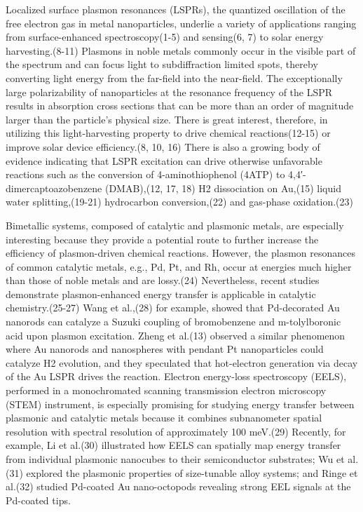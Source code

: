 \documentclass [11pt, proquest] {uwthesis}[2016/11/22]
\begin{document}
Localized surface plasmon resonances (LSPRs), the quantized oscillation of the free electron gas in metal nanoparticles, underlie a variety of applications ranging from surface-enhanced spectroscopy(1-5) and sensing(6, 7) to solar energy harvesting.(8-11) Plasmons in noble metals commonly occur in the visible part of the spectrum and can focus light to subdiffraction limited spots, thereby converting light energy from the far-field into the near-field. The exceptionally large polarizability of nanoparticles at the resonance frequency of the LSPR results in absorption cross sections that can be more than an order of magnitude larger than the particle’s physical size. There is great interest, therefore, in utilizing this light-harvesting property to drive chemical reactions(12-15) or improve solar device efficiency.(8, 10, 16) There is also a growing body of evidence indicating that LSPR excitation can drive otherwise unfavorable reactions such as the conversion of 4-aminothiophenol (4ATP) to 4,4′-dimercaptoazobenzene (DMAB),(12, 17, 18) H2 dissociation on Au,(15) liquid water splitting,(19-21) hydrocarbon conversion,(22) and gas-phase oxidation.(23)

Bimetallic systems, composed of catalytic and plasmonic metals, are especially interesting because they provide a potential route to further increase the efficiency of plasmon-driven chemical reactions. However, the plasmon resonances of common catalytic metals, e.g., Pd, Pt, and Rh, occur at energies much higher than those of noble metals and are lossy.(24) Nevertheless, recent studies demonstrate plasmon-enhanced energy transfer is applicable in catalytic chemistry.(25-27) Wang et al.,(28) for example, showed that Pd-decorated Au nanorods can catalyze a Suzuki coupling of bromobenzene and m-tolylboronic acid upon plasmon excitation. Zheng et al.(13) observed a similar phenomenon where Au nanorods and nanospheres with pendant Pt nanoparticles could catalyze H2 evolution, and they speculated that hot-electron generation via decay of the Au LSPR drives the reaction.
Electron energy-loss spectroscopy (EELS), performed in a monochromated scanning transmission electron microscopy (STEM) instrument, is especially promising for studying energy transfer between plasmonic and catalytic metals because it combines subnanometer spatial resolution with spectral resolution of approximately 100 meV.(29) Recently, for example, Li et al.(30) illustrated how EELS can spatially map energy transfer from individual plasmonic nanocubes to their semiconductor substrates; Wu et al.(31) explored the plasmonic properties of size-tunable alloy systems; and Ringe et al.(32) studied Pd-coated Au nano-octopods revealing strong EEL signals at the Pd-coated tips.
\end{document}
